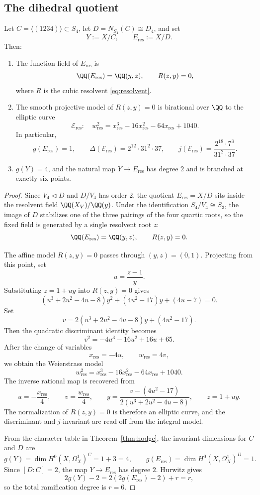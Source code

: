 \subsection{The dihedral quotient}

\begin{proposition}\label{prop:eres}
Let \(C=\langle(1234)\rangle\subset S_4\), let \(D=N_{S_4}(C)\cong D_4\), and set
\[
Y:=X/C,\qquad E_{\mathrm{res}}:=X/D.
\]
Then:
\begin{enumerate}
\item[(i)] The function field of \(E_{\mathrm{res}}\) is
\[
\QQ(E_{\mathrm{res}})=\QQ(y,z),\qquad R(z,y)=0,
\]
where \(R\) is the cubic resolvent \eqref{eq:resolvent}.
\item[(ii)] The smooth projective model of \(R(z,y)=0\) is birational over \(\QQ\) to the elliptic curve
\[
 \mathcal E_{\mathrm{res}}:\quad w_{\mathrm{res}}^2=x_{\mathrm{res}}^3-16x_{\mathrm{res}}^2-64x_{\mathrm{res}}+1040.
\]
In particular,
\[
g(E_{\mathrm{res}})=1,\qquad
\Delta(\mathcal E_{\mathrm{res}})=2^{12}\cdot 31^2\cdot 37,\qquad
j(\mathcal E_{\mathrm{res}})=\frac{2^{18}\cdot 7^3}{31^2\cdot 37}.
\]
\item[(iii)] \(g(Y)=4\), and the natural map \(Y\to E_{\mathrm{res}}\) has degree \(2\) and is branched at exactly six points.
\end{enumerate}
\end{proposition}

\begin{proof}
Since \(V_4\triangleleft D\) and \(D/V_4\) has order \(2\), the quotient \(E_{\mathrm{res}}=X/D\) sits inside the resolvent field \(\QQ(X_V)/\QQ(y)\). Under the identification \(S_4/V_4\cong S_3\), the image of \(D\) stabilizes one of the three pairings of the four quartic roots, so the fixed field is generated by a single resolvent root \(z\):
\[
\QQ(E_{\mathrm{res}})=\QQ(y,z),\qquad R(z,y)=0.
\]

The affine model \(R(z,y)=0\) passes through \((y,z)=(0,1)\). Projecting from this point, set
\[
u=\frac{z-1}{y}.
\]
Substituting \(z=1+uy\) into \(R(z,y)=0\) gives
\[
(u^3+2u^2-4u-8)y^2+(4u^2-17)y+(4u-7)=0.
\]
Set
\[
v=2(u^3+2u^2-4u-8)y+(4u^2-17).
\]
Then the quadratic discriminant identity becomes
\[
v^2=-4u^3-16u^2+16u+65.
\]
After the change of variables
\[
 x_{\mathrm{res}}=-4u,\qquad w_{\mathrm{res}}=4v,
\]
we obtain the Weierstrass model
\[
 w_{\mathrm{res}}^2=x_{\mathrm{res}}^3-16x_{\mathrm{res}}^2-64x_{\mathrm{res}}+1040.
\]
The inverse rational map is recovered from
\[
 u=-\frac{x_{\mathrm{res}}}{4},\qquad
 v=\frac{w_{\mathrm{res}}}{4},\qquad
 y=\frac{v-(4u^2-17)}{2(u^3+2u^2-4u-8)},\qquad
 z=1+uy.
\]
The normalization of \(R(z,y)=0\) is therefore an elliptic curve, and the discriminant and \(j\)-invariant are read off from the integral model.

From the character table in Theorem~\ref{thm:hodge}, the invariant dimensions for \(C\) and \(D\) are
\[
g(Y)=\dim H^0(X,\Omega_X^1)^C=1+3=4,\qquad
g(E_{\mathrm{res}})=\dim H^0(X,\Omega_X^1)^D=1.
\]
Since \([D:C]=2\), the map \(Y\to E_{\mathrm{res}}\) has degree \(2\). Hurwitz gives
\[
2g(Y)-2=2(2g(E_{\mathrm{res}})-2)+r=r,
\]
so the total ramification degree is \(r=6\).
\end{proof}

